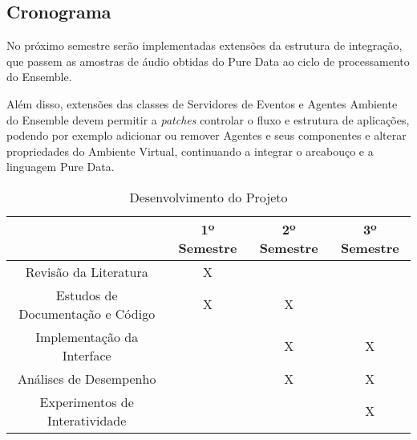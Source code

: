 \documentclass[a4paper, 11pt, twoside]{article}
\begin{document}
\begin{multicols}{2}
\section{Cronograma}

No próximo semestre serão implementadas extensões da estrutura de integração,
que passem as amostras de áudio obtidas do Pure Data ao ciclo de processamento
do Ensemble. 

Além disso, extensões das classes de Servidores de Eventos e Agentes Ambiente
do Ensemble devem permitir a \textit{patches} controlar o fluxo e estrutura
de aplicações, podendo por exemplo adicionar ou remover Agentes e seus 
componentes e alterar propriedades do Ambiente Virtual, continuando a
integrar o arcabouço e a linguagem Pure Data.

\end{multicols}

\begin{table}[H]
\centering

\begin{tabular}{|c|c|c|c|}
\hline 
 & 1º Semestre & 2º Semestre & 3º Semestre \\ \hline 
Revisão da Literatura & X &  &  \\ \hline 
Estudos de Documentação e Código & X & X &  \\ \hline
Implementação da Interface &  & X & X \\ \hline 
Análises de Desempenho &  & X & X \\ \hline 
Experimentos de Interatividade &  &  & X \\ \hline 
\end{tabular} 

\caption{Desenvolvimento do Projeto}
\end{table}

\newpage


\end{document}
